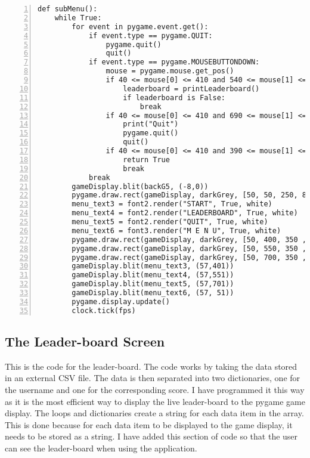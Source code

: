 \documentclass[12pt]{report}
\begin{document}
\tiny
\begin{Verbatim}[numbers=left, frame=single]
def subMenu():
    while True:
        for event in pygame.event.get():
            if event.type == pygame.QUIT:
                pygame.quit()
                quit()
            if event.type == pygame.MOUSEBUTTONDOWN:
                mouse = pygame.mouse.get_pos()
                if 40 <= mouse[0] <= 410 and 540 <= mouse[1] <= 620:
                    leaderboard = printLeaderboard()
                    if leaderboard is False:
                        break
                if 40 <= mouse[0] <= 410 and 690 <= mouse[1] <= 770:
                    print("Quit")
                    pygame.quit()
                    quit()
                if 40 <= mouse[0] <= 410 and 390 <= mouse[1] <= 470:
                    return True
                    break
            break
        gameDisplay.blit(backG5, (-8,0))
        pygame.draw.rect(gameDisplay, darkGrey, [50, 50, 250, 85])
        menu_text3 = font2.render("START", True, white)
        menu_text4 = font2.render("LEADERBOARD", True, white)
        menu_text5 = font2.render("QUIT", True, white)
        menu_text6 = font3.render("M E N U", True, white)
        pygame.draw.rect(gameDisplay, darkGrey, [50, 400, 350 , 60])
        pygame.draw.rect(gameDisplay, darkGrey, [50, 550, 350 , 60])
        pygame.draw.rect(gameDisplay, darkGrey, [50, 700, 350 , 60])
        gameDisplay.blit(menu_text3, (57,401))
        gameDisplay.blit(menu_text4, (57,551))
        gameDisplay.blit(menu_text5, (57,701))
        gameDisplay.blit(menu_text6, (57, 51))
        pygame.display.update()                                                                 
        clock.tick(fps)
\end{Verbatim}

\pagebreak

\normalsize
\subsection{The Leader-board Screen}
This is the code for the leader-board. The code works by taking the data stored in an external CSV file. The data is then separated into two dictionaries, one for the username and one for the corresponding score. I have programmed it this way as it is the most efficient way to display the live leader-board to the pygame game display. The loops and dictionaries create a string for each data item in the array. This is done because for each data item to be displayed to the game display, it needs to be stored as a string. I have added this section of code so that the user can see the leader-board when using the application.
\end{document}
